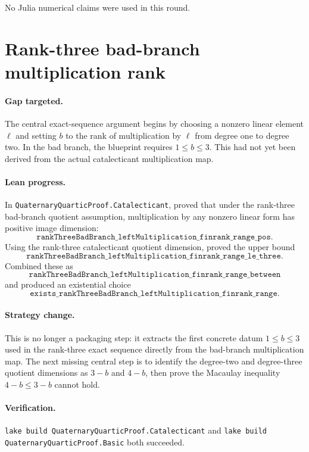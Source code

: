 \documentclass[11pt]{article}
\begin{document}
No Julia numerical claims were used in this round.

\section*{Rank-three bad-branch multiplication rank}

\paragraph{Gap targeted.}
The central exact-sequence argument begins by choosing a nonzero linear
element \(\ell\) and setting \(b\) to the rank of multiplication by \(\ell\)
from degree one to degree two.  In the bad branch, the blueprint requires
\(1\le b\le3\).  This had not yet been derived from the actual catalecticant
multiplication map.

\paragraph{Lean progress.}
In \texttt{QuaternaryQuarticProof.Catalecticant}, proved that under the
rank-three bad-branch quotient assumption, multiplication by any nonzero
linear form has positive image dimension:
\[
\texttt{rankThreeBadBranch\_leftMultiplication\_finrank\_range\_pos}.
\]
Using the rank-three catalecticant quotient dimension, proved the upper bound
\[
\texttt{rankThreeBadBranch\_leftMultiplication\_finrank\_range\_le\_three}.
\]
Combined these as
\[
\texttt{rankThreeBadBranch\_leftMultiplication\_finrank\_range\_between}
\]
and produced an existential choice
\[
\texttt{exists\_rankThreeBadBranch\_leftMultiplication\_finrank\_range}.
\]

\paragraph{Strategy change.}
This is no longer a packaging step: it extracts the first concrete datum
\(1\le b\le3\) used in the rank-three exact sequence directly from the
bad-branch multiplication map.  The next missing central step is to identify
the degree-two and degree-three quotient dimensions as \(3-b\) and \(4-b\),
then prove the Macaulay inequality \(4-b\le3-b\) cannot hold.

\paragraph{Verification.}
\texttt{lake build QuaternaryQuarticProof.Catalecticant} and
\texttt{lake build QuaternaryQuarticProof.Basic} both succeeded.
\end{document}
